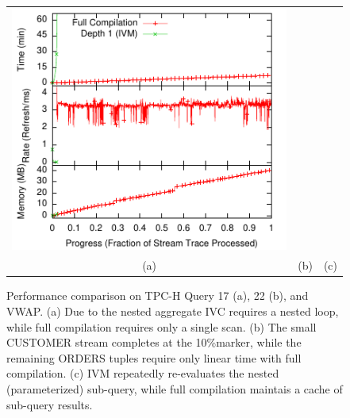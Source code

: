 \begin{figure}
\begin{center}
\begin{minipage}{\textwidth}
\begin{tabular}{ccc}
\includegraphics[width=\figurewidth]{../graphs/graphs/unified_vwap.pdf} \\
(a) & (b) & (c)
\end{tabular}
\caption{Performance comparison on TPC-H Query 17 (a), 22 (b), and VWAP.  (a) Due to the nested aggregate IVC requires a nested loop, while full compilation requires only a single scan. (b) The small CUSTOMER stream completes at the 10\%marker, while the remaining ORDERS tuples require only linear time with full compilation. (c) IVM repeatedly re-evaluates the nested (parameterized) sub-query, while full compilation maintais a cache of sub-query results.}
\label{fig:experiments:tpch17}
\label{fig:experiments:tpch22}
\label{fig:experiments:vwap}
\end{minipage}

\vspace*{0.2in}


\end{center}
\end{figure}
